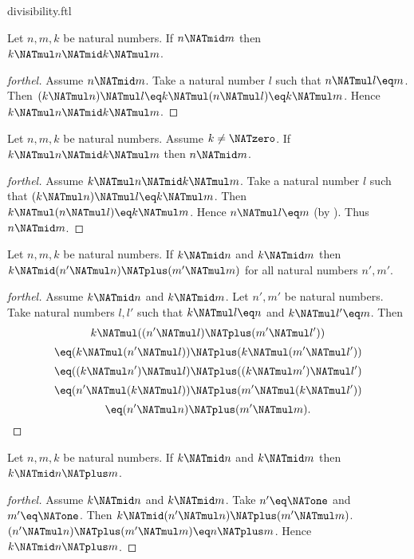 \documentclass{naproche-library}
\begin{document}
\begin{smodule}[title=Divisibility]{divisibility.ftl}
\begin{proposition}[forthel,id=ARITHMETIC_07_1283495225720832]
  Let $n, m, k$ be natural numbers.
  If $n \NATmid m$ then $k \NATmul n \NATmid k \NATmul m$.
\end{proposition}
\begin{proof}[forthel]
  Assume $n \NATmid m$.
  Take a natural number $l$ such that $n \NATmul l \eq m$.
  Then $(k \NATmul n) \NATmul l
    \eq k \NATmul (n \NATmul l)
    \eq k \NATmul m$.
  Hence $k \NATmul n \NATmid k \NATmul m$.
\end{proof}

\begin{proposition}[forthel,id=ARITHMETIC_07_6469492028735488]
  Let $n, m, k$ be natural numbers.
  Assume $k \neq \NATzero$.
  If $k \NATmul n \NATmid k \NATmul m$ then $n \NATmid m$.
\end{proposition}
\begin{proof}[forthel]
  Assume $k \NATmul n \NATmid k \NATmul m$.
  Take a natural number $l$ such that $(k \NATmul n) \NATmul l \eq k \NATmul m$.
  Then $k \NATmul (n \NATmul l) \eq k \NATmul m$.
  Hence $n \NATmul l \eq m$ (by ).
  Thus $n \NATmid m$.
\end{proof}

\begin{proposition}[forthel,id=ARITHMETIC_07_4700711333920768]
  Let $n, m, k$ be natural numbers.
  If $k \NATmid n$ and $k \NATmid m$ then $k \NATmid (n' \NATmul n) \NATplus (m' \NATmul m)$
  for all natural numbers $n', m'$.
\end{proposition}
\begin{proof}[forthel]
  Assume $k \NATmid n$ and $k \NATmid m$.
  Let $n', m'$ be natural numbers.
  Take natural numbers $l,l'$ such that $k \NATmul l \eq n$ and $k \NATmul l' \eq m$.
  Then
  \[  k \NATmul ((n' \NATmul l) \NATplus (m' \NATmul l'))                \]
  \[    \eq (k \NATmul (n' \NATmul l)) \NATplus (k \NATmul (m' \NATmul l'))  \]
  \[    \eq ((k \NATmul n') \NATmul l) \NATplus ((k \NATmul m') \NATmul l')  \]
  \[    \eq (n' \NATmul (k \NATmul l)) \NATplus (m' \NATmul (k \NATmul l'))  \]
  \[    \eq (n' \NATmul n) \NATplus (m' \NATmul m).                      \]
\end{proof}

\begin{corollary}[forthel,id=ARITHMETIC_07_1556786209357824]
  Let $n, m, k$ be natural numbers.
  If $k \NATmid n$ and $k \NATmid m$ then $k \NATmid n \NATplus m$.
\end{corollary}
\begin{proof}[forthel]
  Assume $k \NATmid n$ and $k \NATmid m$.
  Take $n' \eq \NATone$ and $m' \eq \NATone$.
  Then $k \NATmid (n' \NATmul n) \NATplus (m' \NATmul m)$.
  $(n' \NATmul n) \NATplus (m' \NATmul m) \eq n \NATplus m$.
  Hence $k \NATmid n \NATplus m$.
\end{proof}


\end{smodule}
\end{document}
